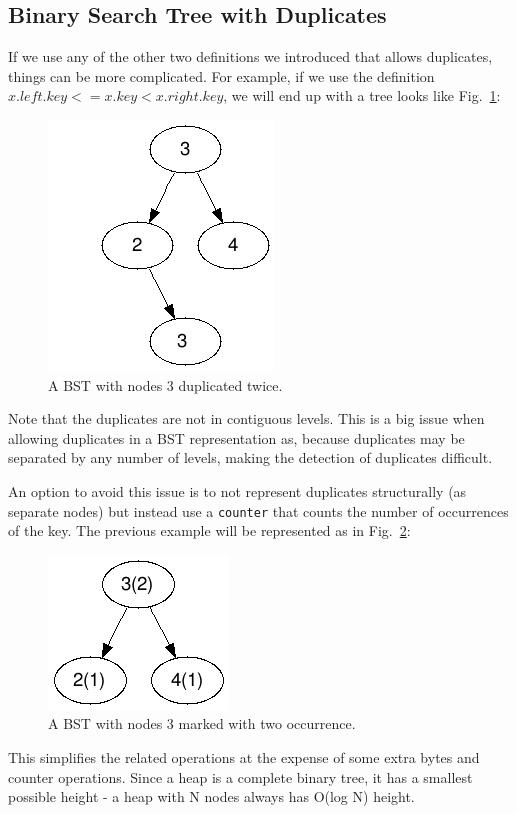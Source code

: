\documentclass[main.tex]{subfiles}
\begin{document}
\subsection{Binary Search Tree with Duplicates}
If we use any of the other two definitions we introduced that allows duplicates, things can be more complicated. For example, if we  use the definition $x.left.key <= x.key < x.right.key$, we will end up with a tree looks like Fig.~\ref{fig:bst_duplicate}: 
\begin{figure}[H]
    \centering
    \includegraphics[width=0.3\columnwidth]{fig/bst_duplicate.png}
    \caption{A BST with nodes 3 duplicated twice.}
    \label{fig:bst_duplicate}
\end{figure}
Note that the duplicates are not in contiguous levels. This is a big issue when allowing duplicates in a BST representation as, because  duplicates may be separated by any number of levels, making the detection of duplicates difficult.

An option to avoid this issue is to not represent duplicates structurally (as separate nodes) but instead use a \texttt{counter} that counts the number of occurrences of the key. The previous example will be represented as in Fig.~\ref{fig:bst_duplicate_counter}:
\begin{figure}[H]
    \centering
    \includegraphics[width=0.3\columnwidth]{fig/bst_duplicate_counter.png}
    \caption{A BST with nodes 3 marked with two occurrence.}
    \label{fig:bst_duplicate_counter}
\end{figure}

This simplifies the related operations at the expense of some extra bytes and counter operations. Since a heap is a complete binary tree, it has a smallest possible height - a heap with N nodes always has O(log N) height. 
\end{document}
